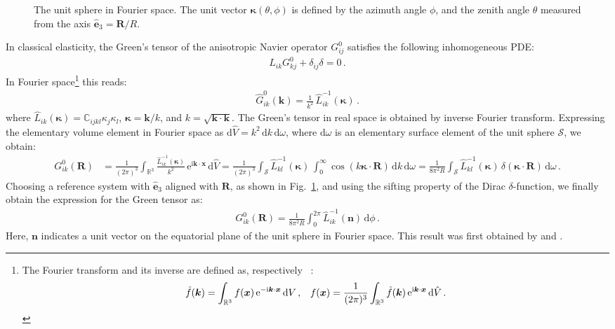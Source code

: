 \begin{figure}[t]
\centering

\caption{The unit sphere in Fourier space. The unit vector $\bm \kappa(\theta,\phi)$ is defined by the azimuth angle $\phi$, and the  zenith angle $\theta$  measured from the axis $\hat{\bm e}_3=\bm R/R$.}
\label{kSpace}
\end{figure}

In classical  elasticity, the Green's  tensor of the anisotropic Navier operator $G^0_{ij}$ satisfies the following inhomogeneous PDE:
\begin{align}
L_{ik}G^0_{kj}+\delta_{ij}\delta=0\, .
\end{align}
In Fourier space\footnote{
The  Fourier transform  and its inverse are defined as, respectively ~\citep{Wl}:
\begin{align}
\hat{f}(\bm k)=\int_{\mathbb{R}^3} f(\bm x)\, \text{e}^{-\text{i}\bm k\cdot\bm x}\, \text{d}V\,, &&
f(\bm x)=\frac{1}{(2\pi)^3}\int_{\mathbb{R}^3} \hat{f}(\bm k)\, \text{e}^{\text{i}\bm k\cdot\bm x}\, \text{d}\hat{V}\,.
\end{align}
} this reads:
\begin{align}
\hat{G}^0_{ik}(\bm k)=\frac{1}{k^2}\,\hat{L}^{-1}_{ik}(\bm \kappa)\, .
\end{align}
where $\hat{L}_{ik}(\bm \kappa)=\mathbb{C}_{ijkl}\kappa_j\kappa_l$, $\bm \kappa=\bm k/k$, and $k=\sqrt{\bm k\cdot\bm k}$. The Green's  tensor in real space  is obtained by inverse  Fourier transform. Expressing the elementary volume element in Fourier space as  $\text{d}\hat{V}=k^2\, \text{d}k\, \text{d}\omega$, where $\text{d}\omega$ is an elementary surface element of the unit sphere $\mathcal{S}$, we obtain:
\begin{align}
G^0_{ik}(\bm R)
&=\frac{1}{(2\pi)^3}\int_{\mathbb{R}^3} \frac{\hat{L}^{-1}_{ik}(\bm \kappa)}{k^2}\, \text{e}^{\text{i}\bm k\cdot\bm x} \, \text{d}\hat{V}
=\frac{1}{(2\pi)^3}\int_\mathcal{S}\hat{L}^{-1}_{kl}(\bm \kappa)\, \int_0^\infty \cos(k\bm\kappa\cdot\bm R)\, \text{d}k  \, \text{d}\omega\nonumber
=\frac{1}{8\pi^2R}\int_\mathcal{S}\hat{L}^{-1}_{kl}(\bm \kappa)\, \delta(\bm\kappa\cdot\bm R)  \, \text{d}\omega\, .
\end{align}
Choosing a reference system with $\hat{\bm e}_3$ aligned with $\bm R$, as shown in Fig.~\ref{kSpace}, and using the sifting property of the Dirac $\delta$-function, we finally obtain the expression for the Green tensor as:
\begin{align}
G^0_{ik}(\bm R)= \frac{1}{8\pi^2R}\int_0^{2\pi} \hat{L}^{-1}_{ik}(\bm n)\,  \text{d}\phi\,.
 \label{G0}
\end{align}
Here, $\bm n$ indicates a unit vector on the equatorial plane of the unit sphere in Fourier space. This result was first obtained by \cite{Lifshitz:1947aa} and \cite{Synge:1957aa}.

